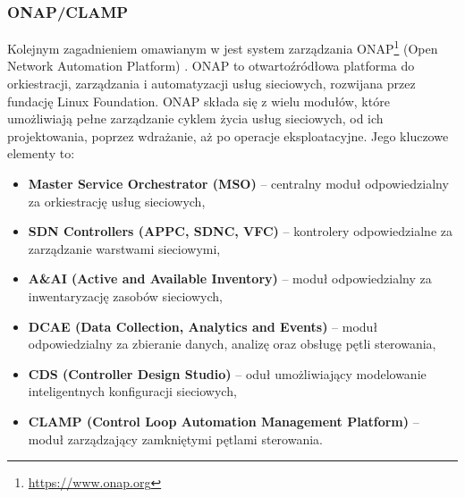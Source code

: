 \subsubsection{ONAP/CLAMP}

Kolejnym zagadnieniem omawianym w \cite{fallon2019} jest system zarządzania ONAP\footnote{\url{https://www.onap.org}} (Open Network Automation Platform) \cite{onap2018}. ONAP to otwartoźródłowa platforma do orkiestracji, zarządzania i automatyzacji usług sieciowych, rozwijana przez fundację Linux Foundation. ONAP składa się z wielu modułów, które umożliwiają pełne zarządzanie cyklem życia usług sieciowych, od ich projektowania, poprzez wdrażanie, aż po operacje eksploatacyjne. Jego kluczowe elementy to:
\begin{itemize}
    \item \textbf{Master Service Orchestrator (MSO)} – centralny moduł odpowiedzialny za orkiestrację usług sieciowych,
    \item \textbf{SDN Controllers (APPC, SDNC, VFC)} –  kontrolery odpowiedzialne za zarządzanie warstwami sieciowymi,
    \item \textbf{A\&AI (Active and Available Inventory)} – moduł odpowiedzialny za inwentaryzację zasobów sieciowych,
    \item \textbf{DCAE (Data Collection, Analytics and Events)} – moduł odpowiedzialny za zbieranie danych, analizę oraz obsługę pętli sterowania,
    \item \textbf{CDS (Controller Design Studio)} – oduł umożliwiający modelowanie inteligentnych konfiguracji sieciowych,
    \item \textbf{CLAMP (Control Loop Automation Management Platform)} – moduł zarządzający zamkniętymi pętlami sterowania.
\end{itemize}

